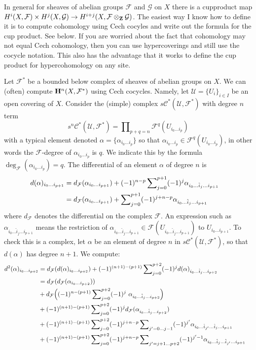 \noindent
In general for sheaves of abelian groups
${\mathcal F}$ and ${\mathcal G}$ on $X$ there is a cupproduct map
$H^i(X, {\mathcal F}) \times H^j(X, {\mathcal G}) \to
H^{i+j}(X, {\mathcal F}\otimes_{\bf Z} {\mathcal G})$. The easiest way
I know how to define it is to compute cohomology using Cech
cocyles and write out the formula for the cup product. See below.
If you are worried about the fact that cohomology may not
equal Cech cohomology, then you can use hypercoverings and still
use the cocycle notation. This also has the advantage that
it works to define the cup product for hypercohomology on any site.

\medskip\noindent
Let ${\mathcal F}^*$ be a bounded below complex of sheaves of abelian
groups on $X$. We can (often) compute ${\bf H}^n(X, {\mathcal F}^*)$
using Cech cocycles. Namely, let ${\mathcal U} = \{U_i\}_{i\in I}$
be an open covering of $X$. Consider the (simple) complex
$s{\mathcal C}^*({\mathcal U}, {\mathcal F}^*)$
with degree $n$ term
$$
s^n{\mathcal C}^*({\mathcal U}, {\mathcal F}^*) =
\prod\nolimits_{p+q=n} {\mathcal F}^q(U_{i_0\ldots i_p})
$$
with a typical element denoted $\alpha = \{\alpha_{i_0\ldots i_p}\}$
so that $\alpha_{i_0\ldots i_p} \in {\mathcal F}^{q}(U_{i_0\ldots i_p})$,
in other words the ${\mathcal F}$-degree of $\alpha_{i_0\ldots i_p}$ is $q$.
We indicate this by the formula $\deg_{\mathcal F}(\alpha_{i_0\ldots i_p})=q$.
The differential of an element $\alpha$ of degree $n$ is
\begin{align*}
d(\alpha)_{i_0\ldots i_{p+1}}
& =
d_{{\mathcal F}}(\alpha_{i_0\ldots i_{p+1}})
+
(-1)^{n-p}
\sum\nolimits_{j=0}^{p+1}
(-1)^j
\alpha_{i_0\ldots \hat i_j \ldots i_{p+1}}\cr
& =
d_{{\mathcal F}}(\alpha_{i_0\ldots i_{p+1}})
+
\sum\nolimits_{j=0}^{p+1}
(-1)^{j+n-p}
\alpha_{i_0\ldots \hat i_j \ldots i_{p+1}}
\end{align*}
where $d_{\mathcal F}$ denotes the differential on the complex ${\mathcal F}$.
An expression such as
$\alpha_{i_0\ldots\hat i_j\ldots i_{p+1}}$ means the restriction
of $\alpha_{i_0\ldots\hat i_j\ldots i_{p+1}} \in
{\mathcal F}(U_{i_0\ldots\hat i_j\ldots i_{p+1}})$ to 
$U_{i_0\ldots i_{p+1}}$.
To check this is a complex, let $\alpha$ be an element of
degree $n$ in $s{\mathcal C}^*({\mathcal U},{\mathcal F}^*)$, so that
$d(\alpha)$ has degree $n+1$. We compute:
\begin{align*}
d^2(\alpha)_{i_0\ldots i_{p+2}} 
& =
d_{{\mathcal F}}(d(\alpha)_{i_0\ldots i_{p+2}})
+
(-1)^{(n+1)-(p+1)}
\sum\nolimits_{j=0}^{p+2}
(-1)^j
d(\alpha)_{i_0\ldots \hat i_j \ldots i_{p+2}}
\cr
& =
d_{\mathcal F}( d_{{\mathcal F}}(\alpha_{i_0\ldots i_{p+2}}) )
\cr
& +
d_{\mathcal F}\Big(
(-1)^{n-(p+1)}
\sum\nolimits_{j=0}^{p+2}
(-1)^j
\ \alpha_{i_0\ldots \hat i_j \ldots i_{p+2}}
\Big)
\cr
& +
(-1)^{(n+1)-(p+1)}
\sum\nolimits_{j=0}^{p+2}
(-1)^j
d_{{\mathcal F}}(\alpha_{i_0\ldots \hat i_j\ldots i_{p+2}})
\cr
& +
(-1)^{(n+1)-(p+1)}
\sum\nolimits_{j=0}^{p+2}
(-1)^{j+n-p}
\sum\nolimits_{j'=0\ldots j-1}
(-1)^{j'}
\alpha_{i_0\ldots \hat i_{j'}\ldots\hat i_{j} \ldots i_{p+1}}
\cr
& +
(-1)^{(n+1)-(p+1)}
\sum\nolimits_{j=0}^{p+2}
(-1)^{j+n-p}
\sum\nolimits_{j'=j+1\ldots p+2}
(-1)^{j'-1}
\alpha_{i_0\ldots \hat i_j\ldots\hat i_{j'} \ldots i_{p+1}}
\end{align*}
